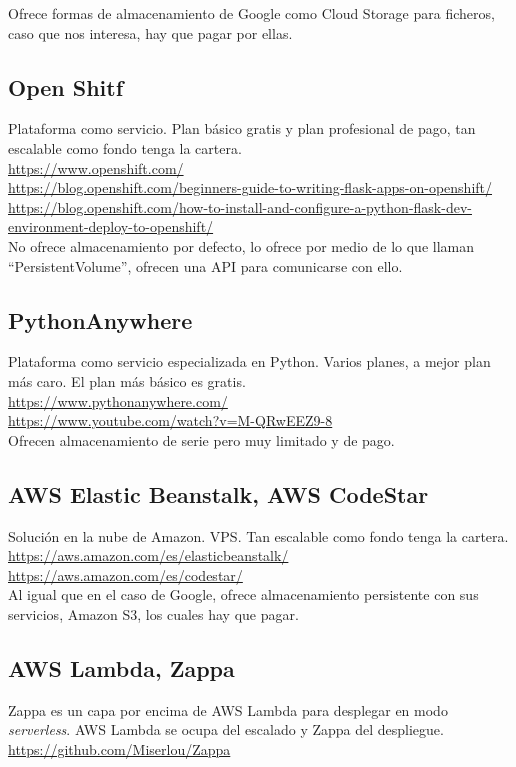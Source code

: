 Ofrece formas de almacenamiento de Google como Cloud Storage para ficheros, caso
que nos interesa, hay que pagar por ellas.
\subsection{Open Shitf}
Plataforma como servicio. Plan básico gratis y plan profesional de pago, tan
escalable como fondo tenga la cartera.\\
\url{https://www.openshift.com/}\\
\url{https://blog.openshift.com/beginners-guide-to-writing-flask-apps-on-openshift/}\\
\url{https://blog.openshift.com/how-to-install-and-configure-a-python-flask-dev-environment-deploy-to-openshift/}\\

No ofrece almacenamiento por defecto, lo ofrece por medio de lo que llaman
``PersistentVolume'', ofrecen una API para comunicarse con ello.
\subsection{PythonAnywhere} 
Plataforma como servicio especializada en Python. Varios planes, a mejor plan
más caro. El plan más básico es gratis.\\
\url{https://www.pythonanywhere.com/}\\
\url{https://www.youtube.com/watch?v=M-QRwEEZ9-8}\\
Ofrecen almacenamiento de serie pero muy limitado y de pago.
\subsection{AWS Elastic Beanstalk,  AWS CodeStar}
Solución en la nube de Amazon. VPS. Tan escalable como fondo tenga la cartera.\\
\url{https://aws.amazon.com/es/elasticbeanstalk/}\\
\url{https://aws.amazon.com/es/codestar/}\\

Al igual que en el caso de Google, ofrece almacenamiento persistente con sus
servicios, Amazon S3, los cuales hay que pagar.
\subsection{AWS Lambda, Zappa}
Zappa es un capa por encima de AWS Lambda para desplegar en modo
\textit{serverless}. AWS Lambda se ocupa del escalado y Zappa del despliegue.\\
\url{https://github.com/Miserlou/Zappa}\\

